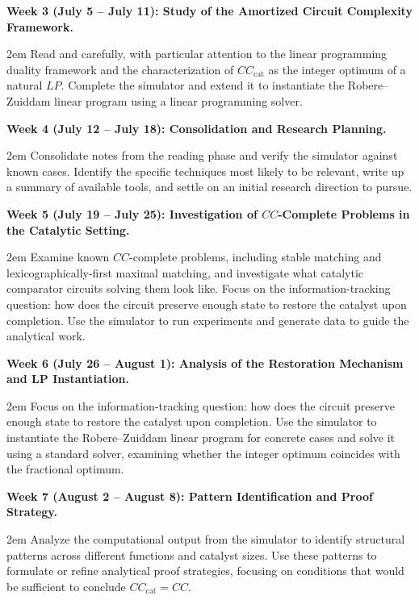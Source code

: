 \documentclass[12pt]{article}
\newcommand{\CCC}{CC_\text{cat}}
\begin{document}
\textbf{Week 3 (July 5 -- July 11): Study of the Amortized Circuit 
Complexity Framework.}
    \begin{adjustwidth}{2em}{}
        Read \textcite{CookMertz2024} and \textcite{RobreZuiddam2021} carefully, with particular attention to the linear programming duality framework and the characterization of $\CCC$ as the integer optimum of a natural $LP$. Complete the simulator and extend it to instantiate the Robere--Zuiddam linear program using a linear programming solver.
    \end{adjustwidth}

\textbf{Week 4 (July 12 -- July 18): Consolidation and Research 
Planning.}
    \begin{adjustwidth}{2em}{}
        Consolidate notes from the reading phase and verify the simulator against known cases. Identify the specific techniques most likely to be relevant, write up a summary of available tools, and settle on an initial research direction to pursue.
    \end{adjustwidth}

\textbf{Week 5 (July 19 -- July 25): Investigation of $CC$-Complete 
Problems in the Catalytic Setting.}

    \begin{adjustwidth}{2em}{}
        Examine known $CC$-complete problems, including stable matching and lexicographically-first maximal matching, and investigate what catalytic comparator circuits solving them look like. Focus on the information-tracking question: how does the circuit preserve enough state to restore the catalyst upon completion. Use the simulator to run experiments and generate data to guide the analytical work.
    \end{adjustwidth}

\textbf{Week 6 (July 26 -- August 1): Analysis of the Restoration 
Mechanism and LP Instantiation.}

    \begin{adjustwidth}{2em}{}
        Focus on the information-tracking question: how does the circuit preserve enough state to restore the catalyst upon completion. Use the simulator to instantiate the Robere--Zuiddam linear program for concrete cases and solve it using a standard solver, examining whether the integer optimum coincides with the fractional optimum.
    \end{adjustwidth}
\textbf{Week 7 (August 2 -- August 8): Pattern Identification and 
Proof Strategy.}

    \begin{adjustwidth}{2em}{}
        Analyze the computational output from the simulator to identify structural patterns across different functions and catalyst sizes. Use these patterns to formulate or refine analytical proof strategies, focusing on conditions that would be sufficient to conclude $\CCC = CC$.
    \end{adjustwidth}
    
\end{document}
